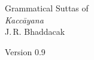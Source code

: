 \begin{titlepage}
\setcounter{page}{1}
{\noindent\fontsize{26pt}{26pt}\upshape Grammatical Suttas of}\\[2\baselineskip]
{\noindent\fontsize{46pt}{46pt}\itshape Kaccāyana}\\[8\baselineskip]
{\LARGE J.\,R. Bhaddacak}\par
{}
{\noindent\ttfamily Version 0.9}
\end{titlepage}
\endinput
